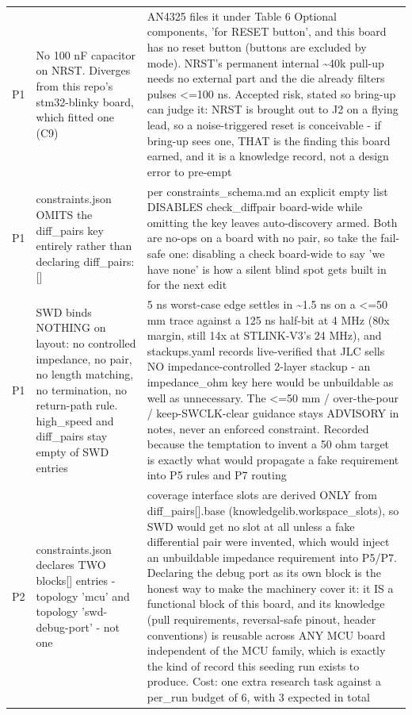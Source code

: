 \documentclass[11pt,a4paper]{article}
\begin{document}
{\begin{longtable}{lp{5.2cm}p{7.2cm}}
P1 & No 100 nF capacitor on NRST. Diverges from this repo's stm32-blinky board, which fitted one (C9) & AN4325 files it under Table 6 Optional components, 'for RESET button', and this board has no reset button (buttons are excluded by mode). NRST's permanent internal \textasciitilde{}40k pull-up needs no external part and the die already filters pulses \textless{}=100 ns. Accepted risk, stated so bring-up can judge it: NRST is brought out to J2 on a flying lead, so a noise-triggered reset is conceivable - if bring-up sees one, THAT is the finding this board earned, and it is a knowledge record, not a design error to pre-empt \\
P1 & constraints.json OMITS the diff\_pairs key entirely rather than declaring diff\_pairs: {[}{]} & per constraints\_schema.md an explicit empty list DISABLES check\_diffpair board-wide while omitting the key leaves auto-discovery armed. Both are no-ops on a board with no pair, so take the fail-safe one: disabling a check board-wide to say 'we have none' is how a silent blind spot gets built in for the next edit \\
P1 & SWD binds NOTHING on layout: no controlled impedance, no pair, no length matching, no termination, no return-path rule. high\_speed and diff\_pairs stay empty of SWD entries & 5 ns worst-case edge settles in \textasciitilde{}1.5 ns on a \textless{}=50 mm trace against a 125 ns half-bit at 4 MHz (80x margin, still 14x at STLINK-V3's 24 MHz), and stackups.yaml records live-verified that JLC sells NO impedance-controlled 2-layer stackup - an impedance\_ohm key here would be unbuildable as well as unnecessary. The \textless{}=50 mm / over-the-pour / keep-SWCLK-clear guidance stays ADVISORY in notes, never an enforced constraint. Recorded because the temptation to invent a 50 ohm target is exactly what would propagate a fake requirement into P5 rules and P7 routing \\
P2 & constraints.json declares TWO blocks{[}{]} entries - topology 'mcu' and topology 'swd-debug-port' - not one & coverage interface slots are derived ONLY from diff\_pairs{[}{]}.base (knowledgelib.workspace\_slots), so SWD would get no slot at all unless a fake differential pair were invented, which would inject an unbuildable impedance requirement into P5/P7. Declaring the debug port as its own block is the honest way to make the machinery cover it: it IS a functional block of this board, and its knowledge (pull requirements, reversal-safe pinout, header conventions) is reusable across ANY MCU board independent of the MCU family, which is exactly the kind of record this seeding run exists to produce. Cost: one extra research task against a per\_run budget of 6, with 3 expected in total \\

\end{longtable}}
\end{document}
